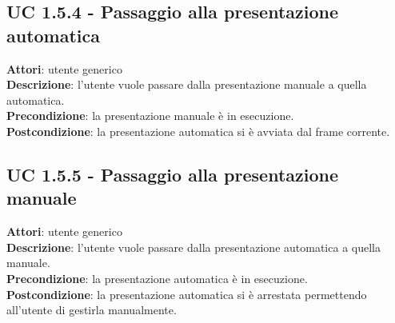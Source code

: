 	\subsection{UC 1.5.4 - Passaggio alla presentazione automatica}{
		\label{uc1.5.4}
		\textbf{Attori}: utente generico \\
		\textbf{Descrizione}: l'utente vuole passare dalla presentazione manuale a quella automatica. \\
		\textbf{Precondizione}: la presentazione manuale è in esecuzione.	\\
		\textbf{Postcondizione}: la presentazione automatica si è avviata dal frame corrente.	\\
	}
	\subsection{UC 1.5.5 - Passaggio alla presentazione manuale}{
		\label{uc1.5.5}
		\textbf{Attori}: utente generico \\
		\textbf{Descrizione}: l'utente vuole passare dalla presentazione automatica a quella manuale. \\
		\textbf{Precondizione}: la presentazione automatica è in esecuzione.	\\
		\textbf{Postcondizione}: la presentazione automatica si è arrestata permettendo all'utente di gestirla manualmente.	\\
	}